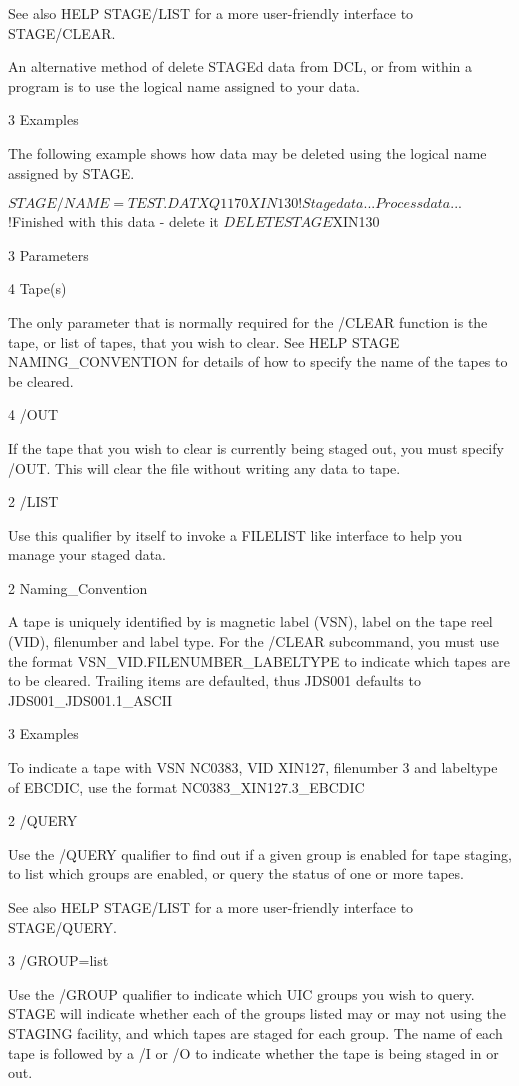 \begin{XMP}
See also HELP STAGE/LIST for a more user-friendly interface to
STAGE/CLEAR.

An alternative method of delete STAGEd data from DCL, or from within
a program is to use the logical name assigned to your data.

3 Examples

The following example shows how data may be deleted using the logical
name assigned by STAGE.

$STAGE/NAME=TEST.DAT XQ1170 XIN130 ! Stage data
... Process data ...
$!Finished with this data - delete it
$DELETE STAGE$XIN130


3 Parameters

4 Tape(s)

The only parameter that is normally required for the /CLEAR function
is the tape, or list of tapes, that you wish to clear.
See HELP STAGE NAMING_CONVENTION for details of how to specify
the name of the tapes to be cleared.

4 /OUT

If the tape that you wish to clear is currently being staged out,
you must specify /OUT. This will clear the file without writing
any data to tape.

2 /LIST

Use this qualifier by itself to invoke a FILELIST like interface to help
you manage your staged data.

2 Naming_Convention

 A tape is uniquely identified by is magnetic label (VSN),
 label on the tape reel (VID), filenumber and label type. For the
 /CLEAR subcommand, you must use the format VSN_VID.FILENUMBER_LABELTYPE
 to indicate which tapes are to be cleared. Trailing items are defaulted,
 thus JDS001 defaults to JDS001_JDS001.1_ASCII

3 Examples

To indicate a tape with VSN NC0383, VID XIN127, filenumber 3 and labeltype
of EBCDIC, use the format NC0383_XIN127.3_EBCDIC

2 /QUERY

Use the /QUERY qualifier to find out if a given group is enabled for
tape staging, to list which groups are enabled, or query the status
of one or more tapes.

See also HELP STAGE/LIST for a more user-friendly interface to
STAGE/QUERY.

3 /GROUP=list

Use the /GROUP qualifier to indicate which UIC groups you wish to
query. STAGE will indicate whether each of the groups listed may or
may not using the STAGING facility, and which tapes are staged for
each group. The name of each tape is followed by a /I or /O to indicate
whether the tape is being staged in or out.


\end{XMP}
